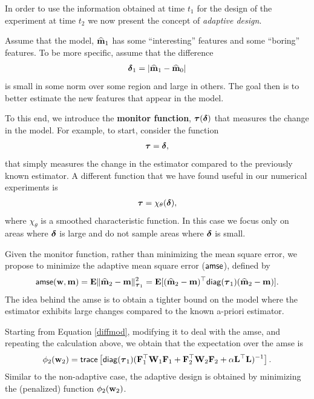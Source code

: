 \documentclass[final,leqno,onefignum,onetabnum]{siamltexmm}
\begin{document}
In order to use the information obtained at time $t_{1}$ for the design of the experiment at time $t_{2}$ we now present the concept of {\em adaptive design}.

 Assume that the model, ${\widehat{{\bf{m}}}}_{1}$ has some ``interesting'' features and some ``boring'' features.
To be more specific, assume that the difference
%
\begin{align}
 { \boldsymbol \delta}_{1} = |{\widehat{{\bf{m}}}}_{1} - {\widehat{{\bf{m}}}}_{0}|
\end{align}
%
is small in some norm over some region and large in others. The goal then is to better estimate the new features
that appear in the model.

To this end, we introduce the {\bf monitor function}, ${\boldsymbol \tau}({ \boldsymbol \delta})$ that measures
the change in the model. 
For example, to start, consider the function
%
\begin{align}
\label{taufuns}
\bftau = \bfdelta,
\end{align}
%
that simply measures the change in the estimator compared to the previously known estimator. 
A different function that we have found useful in our numerical experiments is
%
\begin{align}
\label{taufunschi}
\bftau = \chi_{\theta}(\bfdelta),
\end{align}
%
where $\chi_{\theta}$ is a smoothed characteristic function. In this case we focus only on areas
where ${ \boldsymbol \delta}$ is large and do not sample areas where ${ \boldsymbol \delta}$ is small.

Given the monitor function,
rather than minimizing the mean square error, we propose to minimize the
adaptive mean square error (${\sf amse}$), defined by
%
\begin{align}
\label{amse}
{\sf amse}(\bfw,\bfm) = \bfE\| \bfmhat_2 -\bfm \|_{\bftau_1}^{2} = 
 \bfE[(\bfmhat_2 -\bfm)^{\top}{\sf diag}(\bftau_1)(\bfmhat_2 -\bfm)].
 \end{align}
The idea behind the {\sf amse} is to obtain a tighter bound on the model where the estimator exhibits large changes
compared to the known a-priori estimator. 

Starting from  Equation \eqref{diffmod}, modifying it to deal with the {\sf amse}, and repeating the calculation above, we obtain that the expectation 
over the {\sf amse} is
%
\begin{align}
\label{design2ad}
\phi_{2}(\bfw_{2}) =  {\sf trace} \left[  {\sf diag}(\bftau_1) (\bfF_{1}^{\top}\bfW_{1}\bfF_{1}   + \bfF_{2}^{\top}\bfW_{2}\bfF_{2} +
\alpha \LtL)^{-1} \right]. 
\end{align}
%
Similar to the non-adaptive case, the adaptive design is obtained by minimizing the (penalized) function $\phi_{2}({\bf{w}}_{2})$.
\end{document}
